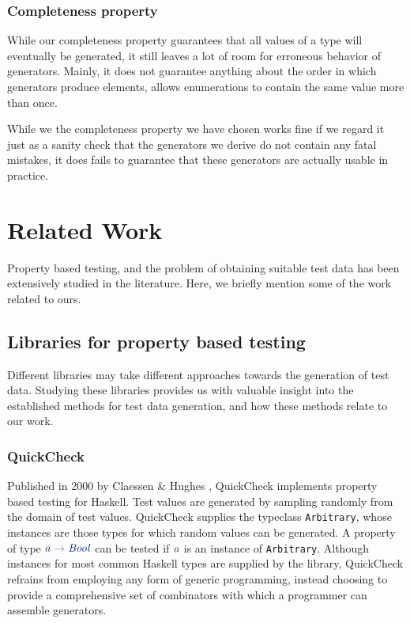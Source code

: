 \documentclass[a4paper,msc,twosized=semi]{uustthesis}
\newcommand*{\mathcolor}{}
\def\mathcolor#1#{\mathcoloraux{#1}}
\newcommand*{\mathcoloraux}[3]{%
  \protect\leavevmode
  \begingroup
    \color#1{#2}#3%
  \endgroup
}
\newcommand{\HSSym}[1]{\mathcolor{hsblue4}{#1}}
\newcommand{\HSCon}[1]{\mathcolor{hsblue3}{\mathit{#1}}}
\newcommand{\HSVar}[1]{\mathcolor{hsblue5}{\mathit{#1}}}
\begin{document}
\subsubsection{Completeness property}

  While our completeness property guarantees that all values of a type will eventually 
  be generated, it still leaves a lot of room for erroneous behavior of generators. Mainly, 
  it does not guarantee anything about the order in which generators produce elements, 
  allows enumerations to contain the same value more than once. 

  While we the completeness property we have chosen works fine if we regard it just as 
  a sanity check that the generators we derive do not contain any fatal mistakes, it 
  does fails to guarantee that these generators are actually usable in practice. 

\section{Related Work}

  Property based testing, and the problem of obtaining suitable test data has been 
  extensively studied in the literature. Here, we briefly mention some of the work 
  related to ours. 

\subsection{Libraries for property based testing}

  Different libraries may take different approaches towards the generation of 
  test data. Studying these libraries provides us with valuable insight into the established methods for test data generation, and how these methods relate to our work. 

\subsubsection{QuickCheck}

  Published in 2000 by Claessen \& Hughes \cite{claessen2011quickcheck}, QuickCheck 
  implements property based testing for Haskell. Test values are generated by sampling 
  randomly from the domain of test values. QuickCheck supplies the typeclass \texttt
  {Arbitrary}, whose instances are those types for which random values can be 
  generated. A property of type \ensuremath{\HSVar{a}\HSSym{\to} \HSCon{Bool}} can be tested if \ensuremath{\HSVar{a}} is an instance of 
  \texttt{Arbitrary}. Although instances for most common Haskell types are supplied by the 
  library, QuickCheck refrains from employing any form of generic programming, instead 
  choosing to provide a comprehensive set of combinators with which a programmer can 
  assemble generators. 
\end{document}
